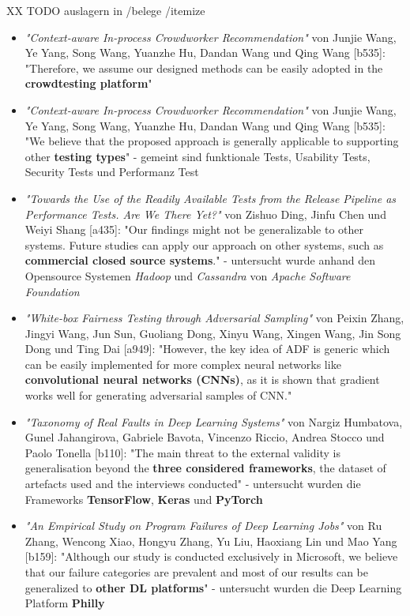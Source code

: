 XX TODO auslagern in /belege /itemize \\
\begin{itemize}
    \item  \textit{"Context-aware In-process Crowdworker Recommendation"} von Junjie Wang, Ye Yang, Song Wang, Yuanzhe Hu, Dandan Wang und Qing Wang [b535]: "Therefore, we assume our designed methods can be easily adopted in the \textbf{crowdtesting platform}"
    \item  \textit{"Context-aware In-process Crowdworker Recommendation"} von Junjie Wang, Ye Yang, Song Wang, Yuanzhe Hu, Dandan Wang und Qing Wang [b535]: "We believe that the proposed approach is generally applicable to supporting other \textbf{testing types}" - gemeint sind funktionale Tests, Usability Tests, Security Tests und Performanz Test
    \item \textit{"Towards the Use of the Readily Available Tests from the Release Pipeline as Performance Tests. Are We There Yet?"} von Zishuo Ding, Jinfu Chen und Weiyi Shang [a435]: "Our findings might not be generalizable to other systems. Future studies can apply our approach on other systems, such as \textbf{commercial closed source systems}." - untersucht wurde anhand den Opensource Systemen \textit{Hadoop} und \textit{Cassandra} von \textit{Apache Software Foundation}
    \item \textit{"White-box Fairness Testing through Adversarial Sampling"} von Peixin Zhang, Jingyi Wang, Jun Sun, Guoliang Dong, Xinyu Wang, Xingen Wang, Jin Song Dong und Ting Dai [a949]: "However, the key idea of ADF is generic which can be easily implemented for more complex neural networks like \textbf{convolutional neural networks (CNNs)}, as it is shown that gradient works well for generating adversarial samples of CNN."
    \item \textit{"Taxonomy of Real Faults in Deep Learning Systems"} von Nargiz Humbatova, Gunel Jahangirova, Gabriele Bavota, Vincenzo Riccio, Andrea Stocco und Paolo Tonella [b110]: "The main threat to the external validity is generalisation beyond the \textbf{three considered frameworks}, the dataset of artefacts used and the interviews conducted" - untersucht wurden die Frameworks \textbf{TensorFlow}, \textbf{Keras} und \textbf{PyTorch}
    \item \textit{"An Empirical Study on Program Failures of Deep Learning Jobs"} von Ru Zhang, Wencong Xiao, Hongyu Zhang, Yu Liu, Haoxiang Lin und Mao Yang [b159]: "Although our study is conducted exclusively in Microsoft, we believe that our failure categories are prevalent and most of our results can be generalized to \textbf{other DL platforms}" - untersucht wurden die Deep Learning Platform \textbf{Philly}

\end{itemize}
